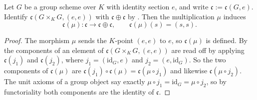 \begin{lemma}
\label{lem:av-cotangent-group-law}
Let $G$ be a group scheme over $K$ with identity section $e$, and write
$\mathfrak c:=\mathfrak c(G,e)$.  Identify $\mathfrak c(G\times_KG,(e,e))$ with
$\mathfrak c\oplus\mathfrak c$ by .  Then the
multiplication $\mu$ induces
\[
  \mathfrak c(\mu)\colon\mathfrak c\longrightarrow\mathfrak c\oplus\mathfrak c,
  \qquad \mathfrak c(\mu)(s)=(s,s).
\]
\end{lemma}
\begin{proof}
The morphism $\mu$ sends the $K$-point $(e,e)$ to $e$, so $\mathfrak c(\mu)$ is
defined.  By  the components of an element of
$\mathfrak c(G\times_KG,(e,e))$ are read off by applying $\mathfrak c(j_1)$ and
$\mathfrak c(j_2)$, where $j_1=(\mathrm{id}_G,e)$ and $j_2=(e,\mathrm{id}_G)$.
So the two components of $\mathfrak c(\mu)$ are $\mathfrak c(j_1)\circ\mathfrak
c(\mu)=\mathfrak c(\mu\circ j_1)$ and likewise $\mathfrak c(\mu\circ j_2)$.
The unit axioms of a group object say exactly $\mu\circ
j_1=\mathrm{id}_G=\mu\circ j_2$, so by functoriality both components are the
identity of $\mathfrak c$.
\end{proof}

